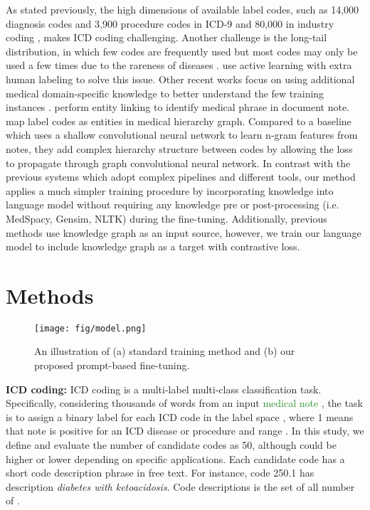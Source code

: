 \documentclass[11pt]{article}
\begin{document}
As stated previously, the high dimensions of available label codes, such as 14,000 diagnosis codes and 3,900 procedure codes in ICD-9 and 80,000 in industry coding \citep{Ziletti2022MedicalCW}, makes ICD coding challenging. Another challenge is the long-tail distribution, in which few codes are frequently used but most codes may only be used a few times due to the rareness of diseases \citep{Shi2017TowardsAI, Xie2019EHRCW}. 
\citet{Mottaghi2020MedicalSR} use active learning with extra human labeling to solve this issue.
Other recent works focus on using additional medical domain-specific knowledge to better understand the few training instances \citep{Cao2020HyperCoreHA, Song2020GeneralizedZT, Lu2020MultilabelFL, falis-etal-2022-horses, wang-etal-2022-novel}. 
\citet{Wu2017SemEHRAG} perform entity linking to identify medical phrase in document note.
\citet{Xie2019EHRCW} map label codes as entities in medical hierarchy graph. Compared to a baseline which uses a shallow convolutional neural network to learn n-gram features from notes, they add complex hierarchy structure between codes by allowing the loss to propagate through graph convolutional neural network. 
In contrast with the previous systems which adopt complex pipelines and different tools, our method applies a much simpler training procedure by incorporating knowledge into language model without requiring any knowledge pre or post-processing (i.e. MedSpacy, Gensim, NLTK) during the fine-tuning. 
Additionally, previous methods use knowledge graph as an input source, however, we train our language model to include knowledge graph as a target with contrastive loss.


\section{Methods}


\begin{figure*}[t]
	\centering
	\texttt{[image: fig/model.png]}
	\caption{An illustration of (a) standard training method and (b) our proposed prompt-based fine-tuning.}
	\label{fig:model}
\end{figure*}

\textbf{ICD coding:}
ICD coding is 
a multi-label multi-class classification task.
Specifically, considering thousands of words from an input \textcolor{ForestGreen}{medical note} \textcolor{ForestGreen}{}, the task is to assign a binary label  for each ICD code in the label space , where 1 means that note is positive for an ICD disease or procedure and  range . In this study, we define and evaluate the number of candidate codes  as 50, although  could be higher or lower depending on specific applications. 
Each candidate code has a short code description phrase  in free text. For instance, code 250.1 has description \textit{diabetes with ketoacidosis}. \textcolor{BrickRed}{Code descriptions} \textcolor{BrickRed}{} is the set of all  number of .
\end{document}
